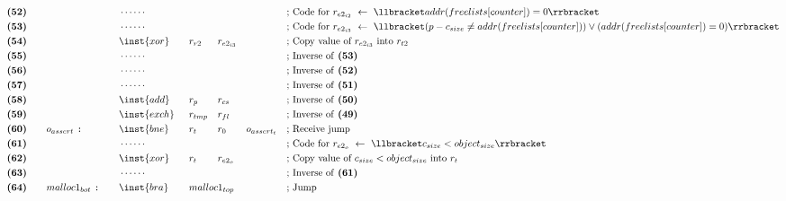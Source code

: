 {\begin{alignat*}{7}
    &\textbf{(52)}\quad&& &&\cdots\cdots && && && &&\text{; Code for $r_{e2_{i2}}\ \leftarrow\ \llbracket addr(freelists[counter]) = 0 \rrbracket$}\\
    &\textbf{(53)}\quad&& &&\cdots\cdots && && && &&\text{; Code for $r_{e2_{i3}}\ \leftarrow\ \llbracket (p - c_{size} \neq addr(freelists[counter])) \vee (addr(freelists[counter]) = 0) \rrbracket$}\\
    &\textbf{(54)}\quad&& &&\inst{xor} &&r_{r2} && r_{e2_{i3}} && && \text{; Copy value of $r_{e2_{i3}}$ into $r_{t2}$}\\
    &\textbf{(55)}\quad&& &&\cdots\cdots && && && &&\text{; Inverse of \textbf{(53)}}\\
    &\textbf{(56)}\quad&& &&\cdots\cdots && && && &&\text{; Inverse of \textbf{(52)}}\\
    &\textbf{(57)}\quad&& &&\cdots\cdots && && && &&\text{; Inverse of \textbf{(51)}}\\
    &\textbf{(58)}\quad&& &&\inst{add} &&r_{p} && r_{cs} && && \text{; Inverse of \textbf{(50)}}\\
    &\textbf{(59)}\quad&& &&\inst{exch} &&r_{tmp} && r_{fl} && && \text{; Inverse of \textbf{(49)}}\\
    &\textbf{(60)}\quad&&o_{assert}\ \texttt{:}\quad &&\inst{bne} &&r_{t} && r_0 && o_{assert_t} && \text{; Receive jump}\\
    &\textbf{(61)}\quad&& &&\cdots\cdots && && && &&\text{; Code for $r_{e2_o}\ \leftarrow\ \llbracket c_{size} < object_{size} \rrbracket$}\\
    &\textbf{(62)}\quad&& &&\inst{xor}\quad &&r_t && r_{e2_o} && &&\text{; Copy value of $c_{size} < object_{size}$ into $r_t$}\\        
    &\textbf{(63)}\quad&& &&\cdots\cdots && && && &&\text{; Inverse of \textbf{(61)}}\\ 
    &\textbf{(64)}\quad&&malloc1_{bot}\ \texttt{:}\quad  &&\inst{bra}\quad &&malloc1_{top} \span\omit\span\quad \span\omit\span\quad &&\text{; Jump}\\
\end{alignat*}

}%
